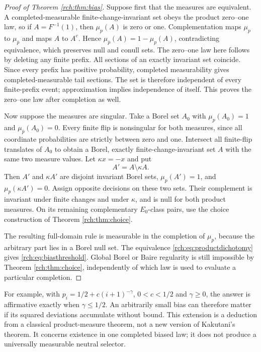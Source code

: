 \documentclass[11pt]{article}
\theoremstyle{definition}
\theoremstyle{remark}
\begin{document}
\begin{proof}[Proof of Theorem \ref{rch:thm:bias}]
Suppose first that the measures are equivalent. A completed-measurable
finite-change-invariant set obeys the product zero--one law, so if
\(A=F^{-1}(1)\), then \(\mu_p(A)\) is zero or one. Complementation maps
\(\mu_p\) to \(\mu_{\bar p}\) and maps \(A\) to \(A^c\). Hence
\(\mu_{\bar p}(A)=1-\mu_p(A)\), contradicting equivalence, which preserves
null and conull sets. The zero--one law here follows by deleting any finite
prefix. All sections of an exactly invariant set coincide. Since every prefix
has positive probability, completed measurability gives completed-measurable
tail sections. The set is therefore independent of every finite-prefix event;
approximation implies independence of itself. This proves the zero--one law
after completion as well.

Now suppose the measures are singular. Take a Borel set \(A_0\) with
\(\mu_p(A_0)=1\) and \(\mu_{\bar p}(A_0)=0\). Every finite flip is
nonsingular for both measures, since all coordinate probabilities are strictly
between zero and one. Intersect all finite-flip translates of \(A_0\) to
obtain a Borel, exactly finite-change-invariant set \(A\) with the same two
measure values. Let \(\kappa x=-x\) and put
\[
 A'=A\setminus\kappa A.
\]
Then \(A'\) and \(\kappa A'\) are disjoint invariant Borel sets,
\(\mu_p(A')=1\), and \(\mu_p(\kappa A')=0\). Assign opposite decisions
on these two sets. Their complement is invariant under finite changes and
under \(\kappa\), and is null for both product measures. On its remaining
complementary \(E_0\)-class pairs, use the choice construction of Theorem
\ref{rch:thm:choice}.

The resulting full-domain rule is measurable in the completion of \(\mu_p\),
because the arbitrary part lies in a Borel null set. The equivalence
\eqref{rch:eq:productdichotomy} gives \eqref{rch:eq:biasthreshold}. Global Borel or
Baire regularity is still impossible by Theorem \ref{rch:thm:choice}, independently
of which law is used to evaluate a particular completion.
\end{proof}

For example, with \(p_i=1/2+c(i+1)^{-\gamma}\), \(0<c<1/2\) and
\(\gamma\ge0\), the answer
is affirmative exactly when \(\gamma\le1/2\). An arbitrarily small bias can
therefore matter if its squared deviations accumulate without bound. This
extension is a deduction from a classical product-measure theorem, not a new
version of Kakutani's theorem. It concerns existence in one completed biased
law; it does not produce a universally measurable neutral selector.
\end{document}
